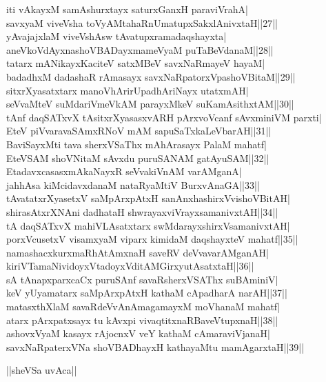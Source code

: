 \documentclass{article}
\begin{document}
iti vAkayxM samAshurxtayx saturxGanxH paraviVrahA|\\
savxyaM viveVsha toVyAMtahaRnUmatupxSakxlAnivxtaH||27||\\
yAvajajxlaM viveVshAsw tAvatupxramadaqshayxta|\\
aneVkoVdAyxnashoVBADayxmameVyaM puTaBeVdanaM||28||\\
tatarx mANikayxKaciteV satxMBeV savxNaRmayeV hayaM|\\
badadhxM dadashaR rAmasayx savxNaRpatorxVpashoVBitaM||29||\\
sitxrXyasatxtarx manoVhArirUpadhAriNayx utatxmAH|\\
seVvaMteV suMdariVmeVkAM parayxMkeV suKamAsithxtAM||30||\\
tAnf daqSATxvX tAsitxrXyasasxvARH pArxvoVcanf sAvxminiVM parxti|\\
EteV piVvaravaSAmxRNoV mAM sapuSaTxkaLeVbarAH||31||\\
BaviSayxMti tava sherxVSaThx mAhArasayx PalaM mahatf|\\
EteVSAM shoVNitaM sAvxdu puruSANAM gatAyuSAM||32||\\
EtadavxcasasxmAkaNayxR seVvakiVnAM varAMganA|\\
jahhAsa kiMcidavxdanaM nataRyaMtiV BurxvAnaGA||33||\\
tAvatatxrXyasetxV saMpArxpAtxH sanAnxhashirxVvishoVBitAH|\\
shirasAtxrXNAni dadhataH shwrayaxviVrayxsamanivxtAH||34||\\
tA daqSATxvX mahiVLAsatxtarx swMdarayxshirxVsamanivxtAH|\\
porxVcusetxV visamxyaM viparx kimidaM daqshayxteV mahatf||35||\\
namashacxkurxmaRhAtAmxnaH saveRV deVvavarAMganAH|\\
kiriVTamaNividoyxVtadoyxVditAMGirxyutAsatxtaH||36||\\
sA tAnapxparxcaCx puruSAnf savaRsherxVSAThx suBAminiV|\\
keV yUyamatarx saMpArxpAtxH kathaM cApadharA narAH||37||\\
matasxthXlaM savaRdeVvAnAmagamayxM moVhanaM mahatf|\\
atarx pArxpatxsayx tu kAvxpi vivaqtitxnaRBaveVtupxnaH||38||\\
ashovxVyaM kasayx rAjocnxV veY kathaM cAmaraviVjanaH|\\
savxNaRpaterxVNa shoVBADhayxH kathayaMtu mamAgarxtaH||39||\\

\begin{center}
||sheVSa uvAca||
\end{center}
\end{document}
